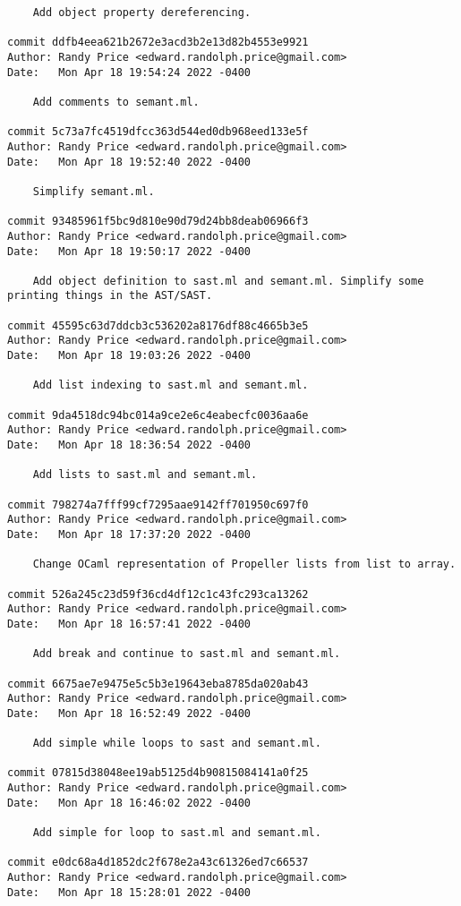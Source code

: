{\begin{verbatim}
    Add object property dereferencing.

commit ddfb4eea621b2672e3acd3b2e13d82b4553e9921
Author: Randy Price <edward.randolph.price@gmail.com>
Date:   Mon Apr 18 19:54:24 2022 -0400

    Add comments to semant.ml.

commit 5c73a7fc4519dfcc363d544ed0db968eed133e5f
Author: Randy Price <edward.randolph.price@gmail.com>
Date:   Mon Apr 18 19:52:40 2022 -0400

    Simplify semant.ml.

commit 93485961f5bc9d810e90d79d24bb8deab06966f3
Author: Randy Price <edward.randolph.price@gmail.com>
Date:   Mon Apr 18 19:50:17 2022 -0400

    Add object definition to sast.ml and semant.ml. Simplify some printing things in the AST/SAST.

commit 45595c63d7ddcb3c536202a8176df88c4665b3e5
Author: Randy Price <edward.randolph.price@gmail.com>
Date:   Mon Apr 18 19:03:26 2022 -0400

    Add list indexing to sast.ml and semant.ml.

commit 9da4518dc94bc014a9ce2e6c4eabecfc0036aa6e
Author: Randy Price <edward.randolph.price@gmail.com>
Date:   Mon Apr 18 18:36:54 2022 -0400

    Add lists to sast.ml and semant.ml.

commit 798274a7fff99cf7295aae9142ff701950c697f0
Author: Randy Price <edward.randolph.price@gmail.com>
Date:   Mon Apr 18 17:37:20 2022 -0400

    Change OCaml representation of Propeller lists from list to array.

commit 526a245c23d59f36cd4df12c1c43fc293ca13262
Author: Randy Price <edward.randolph.price@gmail.com>
Date:   Mon Apr 18 16:57:41 2022 -0400

    Add break and continue to sast.ml and semant.ml.

commit 6675ae7e9475e5c5b3e19643eba8785da020ab43
Author: Randy Price <edward.randolph.price@gmail.com>
Date:   Mon Apr 18 16:52:49 2022 -0400

    Add simple while loops to sast and semant.ml.

commit 07815d38048ee19ab5125d4b90815084141a0f25
Author: Randy Price <edward.randolph.price@gmail.com>
Date:   Mon Apr 18 16:46:02 2022 -0400

    Add simple for loop to sast.ml and semant.ml.

commit e0dc68a4d1852dc2f678e2a43c61326ed7c66537
Author: Randy Price <edward.randolph.price@gmail.com>
Date:   Mon Apr 18 15:28:01 2022 -0400


\end{verbatim}}

